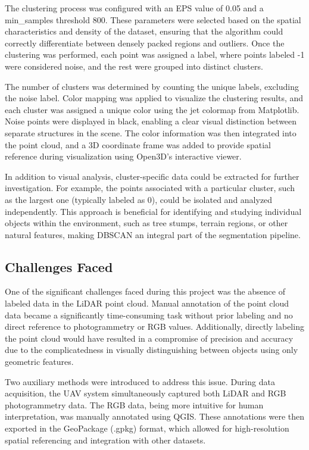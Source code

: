 \documentclass[../report.tex]{subfiles}
\begin{document}
    The clustering process was configured with an EPS value of 0.05 and a min_samples threshold 800. These parameters were selected based on the spatial characteristics and density of the dataset, ensuring that the algorithm could correctly differentiate between densely packed regions and outliers. Once the clustering was performed, each point was assigned a label, where points labeled -1 were considered noise, and the rest were grouped into distinct clusters.
    
    The number of clusters was determined by counting the unique labels, excluding the noise label. Color mapping was applied to visualize the clustering results, and each cluster was assigned a unique color using the jet colormap from Matplotlib. Noise points were displayed in black, enabling a clear visual distinction between separate structures in the scene. The color information was then integrated into the point cloud, and a 3D coordinate frame was added to provide spatial reference during visualization using Open3D’s interactive viewer.
    
    In addition to visual analysis, cluster-specific data could be extracted for further investigation. For example, the points associated with a particular cluster, such as the largest one (typically labeled as 0), could be isolated and analyzed independently. This approach is beneficial for identifying and studying individual objects within the environment, such as tree stumps, terrain regions, or other natural features, making DBSCAN an integral part of the segmentation pipeline.
	\subsection{Challenges Faced}
    One of the significant challenges faced during this project was the absence of labeled data in the LiDAR point cloud. Manual annotation of the point cloud data became a significantly time-consuming task without prior labeling and no direct reference to photogrammetry or RGB values. Additionally, directly labeling the point cloud would have resulted in a compromise of precision and accuracy due to the complicatedness in visually distinguishing between objects using only geometric features.

    Two auxiliary methods were introduced to address this issue. During data acquisition, the UAV system simultaneously captured both LiDAR and RGB photogrammetry data. The RGB data, being more intuitive for human interpretation, was manually annotated using QGIS. These annotations were then exported in the GeoPackage (.gpkg) format, which allowed for high-resolution spatial referencing and integration with other datasets.
    
\end{document}
